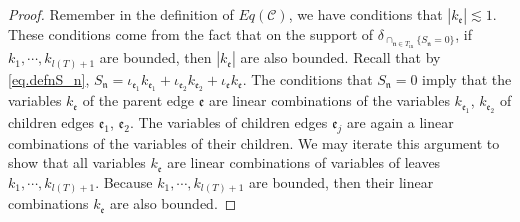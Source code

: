 \begin{proof}

Remember in the definition of $Eq(\mathcal{C})$, we have conditions that $|k_{\mathfrak{e}}|\lesssim 1$. These conditions come from the fact that on the support of $\delta_{\cap_{\mathfrak{n}\in T_{\text{in}}} \{S_{\mathfrak{n}}=0\}}$, if $k_1,\cdots,k_{l(T)+1}$ are bounded, then $|k_{\mathfrak{e}}|$ are also bounded. Recall that by \eqref{eq.defnS_n}, $S_{\mathfrak{n}}=\iota_{\mathfrak{e}_1}k_{\mathfrak{e}_1}+\iota_{\mathfrak{e}_2}k_{\mathfrak{e}_2}+\iota_{\mathfrak{e}}k_{\mathfrak{e}}$. The conditions that $S_{\mathfrak{n}}=0$ imply that the variables $k_{\mathfrak{e}}$ of the parent edge $\mathfrak{e}$ are linear combinations of the variables $k_{\mathfrak{e}_1}$, $k_{\mathfrak{e}_2}$ of children edges $\mathfrak{e}_1$, $\mathfrak{e}_2$. The variables of children edges $\mathfrak{e}_j$ are again a linear combinations of the variables of their children. We may iterate this argument to show that all variables $k_{\mathfrak{e}}$ are linear combinations of variables of leaves $k_1,\cdots,k_{l(T)+1}$. Because $k_1,\cdots,k_{l(T)+1}$ are bounded, then their linear combinations $k_{\mathfrak{e}}$ are also bounded.


\end{proof}
